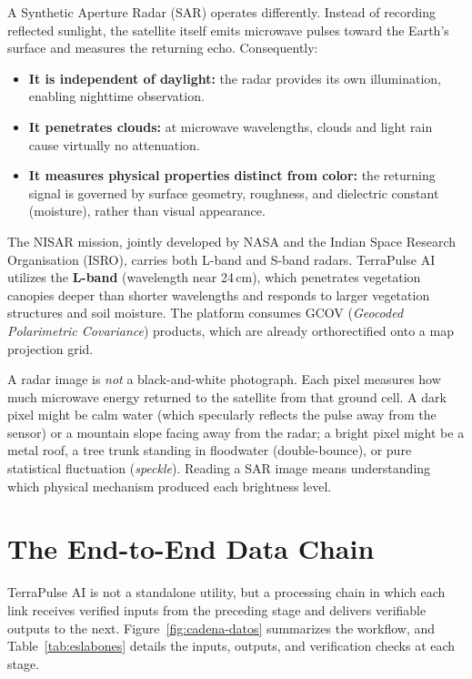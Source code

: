 \documentclass[11pt,a4paper]{article}
\begin{document}
A Synthetic Aperture Radar (SAR) operates differently. Instead of recording reflected sunlight, the satellite itself emits microwave pulses toward the Earth's surface and measures the returning echo. Consequently:
\begin{itemize}
  \item \textbf{It is independent of daylight:} the radar provides its own illumination, enabling nighttime observation.
  \item \textbf{It penetrates clouds:} at microwave wavelengths, clouds and light rain cause virtually no attenuation.
  \item \textbf{It measures physical properties distinct from color:} the returning signal is governed by surface geometry, roughness, and dielectric constant (moisture), rather than visual appearance.
\end{itemize}
The NISAR mission, jointly developed by NASA and the Indian Space Research Organisation (ISRO), carries both L-band and S-band radars. TerraPulse AI utilizes the \textbf{L-band} (wavelength near 24\,cm), which penetrates vegetation canopies deeper than shorter wavelengths and responds to larger vegetation structures and soil moisture. The platform consumes GCOV (\emph{Geocoded Polarimetric Covariance}) products, which are already orthorectified onto a map projection grid.

\begin{intuicion}
A radar image is \emph{not} a black-and-white photograph. Each pixel measures how much microwave energy returned to the satellite from that ground cell. A dark pixel might be calm water (which specularly reflects the pulse away from the sensor) or a mountain slope facing away from the radar; a bright pixel might be a metal roof, a tree trunk standing in floodwater (double-bounce), or pure statistical fluctuation (\emph{speckle}). Reading a SAR image means understanding which physical mechanism produced each brightness level.
\end{intuicion}

\section{The End-to-End Data Chain}
\label{sec:cadena}

TerraPulse AI is not a standalone utility, but a processing chain in which each link receives verified inputs from the preceding stage and delivers verifiable outputs to the next. Figure~\ref{fig:cadena-datos} summarizes the workflow, and Table~\ref{tab:eslabones} details the inputs, outputs, and verification checks at each stage.
\end{document}
